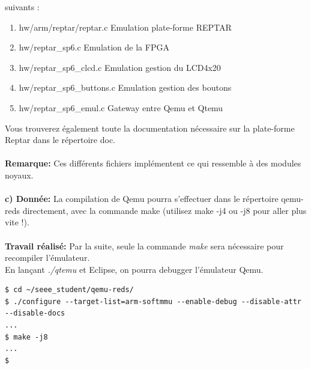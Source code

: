 suivants :
\begin{enumerate}
	\item hw/arm/reptar/reptar.c Emulation plate-forme REPTAR
	\item hw/reptar\_sp6.c Emulation de la FPGA
	\item hw/reptar\_sp6\_clcd.c Emulation gestion du LCD4x20
	\item hw/reptar\_sp6\_buttons.c Emulation gestion des boutons
	\item hw/reptar\_sp6\_emul.c Gateway entre Qemu et Qtemu
\end{enumerate}
Vous trouverez également toute la documentation nécessaire sur la plate-forme Reptar dans le
répertoire doc. \\\\
\textbf{Remarque: }Ces différents fichiers implémentent ce qui ressemble à des modules noyaux.\\\\
\textbf{c) Donnée: } La compilation de Qemu pourra s'effectuer dans le répertoire qemu-reds directement, avec la
commande make (utilisez make -j4 ou -j8 pour aller plus vite !). \\\\
\textbf{Travail réalisé: }Par la suite, seule la commande \textit{make} sera nécessaire pour recompiler l'émulateur.\\
En lançant \textit{./qtemu} et Eclipse, on pourra debugger l'émulateur Qemu.
\begin{lstlisting}
$ cd ~/seee_student/qemu-reds/
$ ./configure --target-list=arm-softmmu --enable-debug --disable-attr --disable-docs 
...
$ make -j8
...
$
\end{lstlisting}
